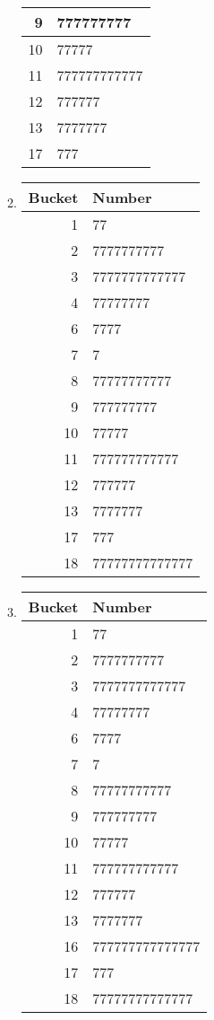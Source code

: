 \documentclass[12pt]{article}
\begin{document}
\begin{enumerate}[a]
\begin{multicols}{2}
\begin{enumerate}[1]
\begin{tabular}{r|l}
			9 & 777777777\\\hline
			10 & 77777\\\hline
			11 & 777777777777\\\hline
			12 & 777777\\\hline
			13 & 7777777\\\hline
			17 & 777
		\end{tabular}
		\item
		\begin{tabular}{r|l}
			Bucket & Number\\\hline\hline
			1 & 77\\\hline
			2 & 7777777777\\\hline
			3 & 7777777777777\\\hline
			4 & 77777777\\\hline
			6 & 7777\\\hline
			7 & 7\\\hline
			8 & 77777777777\\\hline
			9 & 777777777\\\hline
			10 & 77777\\\hline
			11 & 777777777777\\\hline
			12 & 777777\\\hline
			13 & 7777777\\\hline
			17 & 777\\\hline
			18 & 77777777777777
		\end{tabular}
		\item
		\begin{tabular}{r|l}
			Bucket & Number\\\hline\hline
			1 & 77\\\hline
			2 & 7777777777\\\hline
			3 & 7777777777777\\\hline
			4 & 77777777\\\hline
			6 & 7777\\\hline
			7 & 7\\\hline
			8 & 77777777777\\\hline
			9 & 777777777\\\hline
			10 & 77777\\\hline
			11 & 777777777777\\\hline
			12 & 777777\\\hline
			13 & 7777777\\\hline
			16 & 777777777777777\\\hline
			17 & 777\\\hline
			18 & 77777777777777
		\end{tabular}

\end{enumerate}
\end{multicols}
\end{enumerate}
\end{document}
